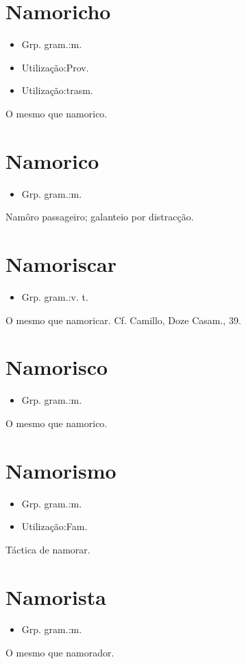 \section{Namoricho}
\begin{itemize}
\item {Grp. gram.:m.}
\end{itemize}
\begin{itemize}
\item {Utilização:Prov.}
\end{itemize}
\begin{itemize}
\item {Utilização:trasm.}
\end{itemize}
O mesmo que \textunderscore namorico\textunderscore .
\section{Namorico}
\begin{itemize}
\item {Grp. gram.:m.}
\end{itemize}
Namôro passageiro; galanteio por distracção.
\section{Namoriscar}
\begin{itemize}
\item {Grp. gram.:v. t.}
\end{itemize}
O mesmo que \textunderscore namoricar\textunderscore . Cf. Camillo, \textunderscore Doze Casam.\textunderscore , 39.
\section{Namorisco}
\begin{itemize}
\item {Grp. gram.:m.}
\end{itemize}
O mesmo que \textunderscore namorico\textunderscore .
\section{Namorismo}
\begin{itemize}
\item {Grp. gram.:m.}
\end{itemize}
\begin{itemize}
\item {Utilização:Fam.}
\end{itemize}
Táctica de namorar.
\section{Namorista}
\begin{itemize}
\item {Grp. gram.:m.}
\end{itemize}
O mesmo que \textunderscore namorador\textunderscore .
